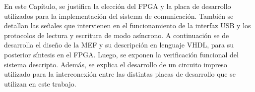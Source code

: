 
En este Capítulo, se justifica la elección del FPGA y la placa de desarrollo utilizados para la implementación del sistema de comunicación. También se detallan las señales que intervienen en el funcionamiento de la interfaz USB y los protocolos de lectura y escritura de modo asíncrono. A continuación se de desarrolla el diseño de la MEF y su descripción en lenguaje VHDL, para su posterior síntesis en el FPGA. Luego, se exponen la verificación funcional del sistema descripto. Además, se explica el desarrollo de un circuito impreso utilizado para la interconexión entre las distintas placas de desarrollo que se utilizan en este trabajo.
